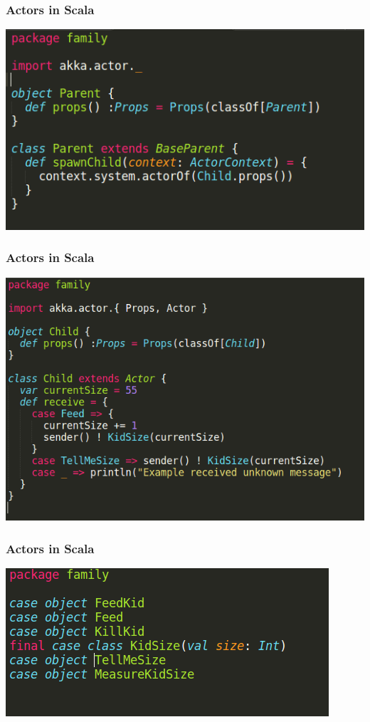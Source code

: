 \documentclass{beamer}
\begin{document}

\begin{frame}
\frametitle{Actors in Scala}
\includegraphics[width=0.8\linewidth]{./parent_actor.png}
\end{frame}


\begin{frame}
\frametitle{Actors in Scala}
\includegraphics[width=0.9\linewidth]{./parent_child.png}
\end{frame}


\begin{frame}
\frametitle{Actors in Scala}
\includegraphics[width=1\linewidth]{./parent_messages.png}
\end{frame}
\end{document}
